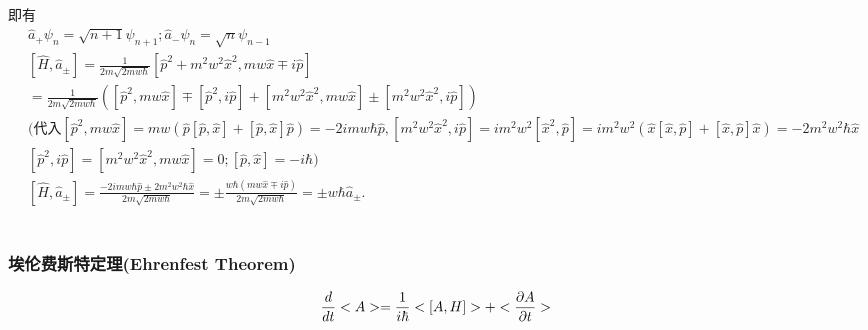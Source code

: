 \documentclass[UTF8,a4paper,10pt]{ctexart}
\begin{document}
即有
\begin{equation}
    \begin{aligned}
        &\hat{a}_{+}\psi_{n}=\sqrt{n+1}\psi_{n+1};\hat{a}_{-}\psi_{n}=\sqrt{n}\psi_{n-1}\\
        &[\hat{H},\hat{a}_{\pm}]=\frac{1}{2m\sqrt{2mw\hbar}}[\hat{p}^2+m^2w^2\hat{x}^2,mw\hat{x}\mp i\hat{p}]\\
        &=\frac{1}{2m\sqrt{2mw\hbar}}([\hat{p}^2,mw\hat{x}]\mp[\hat{p}^2,i\hat{p}]+[m^2w^2\hat{x}^2,mw\hat{x}]\pm[m^2w^2\hat{x}^2,i\hat{p}])\\
        &(\text{代入}[\hat{p}^2,mw\hat{x}]=mw(\hat{p}[\hat{p},\hat{x}]+[\hat{p},\hat{x}]\hat{p})=-2imw\hbar\hat{p},[m^2w^2\hat{x}^2,i\hat{p}]=im^{2}w^{2}[\hat{x}^{2},\hat{p}]=im^2w^2(\hat{x}[\hat{x},\hat{p}]+[\hat{x},\hat{p}]\hat{x})=-2m^2w^2\hbar\hat{x}\\
        &[\hat{p}^2,i\hat{p}]=[m^2w^2\hat{x}^2,mw\hat{x}]=0;[\hat{p},\hat{x}]=-i\hbar)\\
        &[\hat{H},\hat{a}_{\pm}]=\frac{-2imw\hbar\hat{p}\pm 2m^2w^2\hbar\hat{x}}{2m\sqrt{2mw\hbar}}=\pm\frac{w\hbar(mw\hat{x}\mp i\hat{p})}{2m\sqrt{2mw\hbar}}=\pm w\hbar\hat{a}_{\pm}.
    \end{aligned}
\end{equation}

\begin{equation}
    \begin{aligned}
        &
    \end{aligned}
\end{equation}
\subsubsection{埃伦费斯特定理(Ehrenfest Theorem)}

\begin{equation}
    \frac{d}{dt}<A>=\frac{1}{i\hbar}<[A,H]>+<\frac{\partial A}{\partial t}> \\
\end{equation}

\quad \newline
\end{document}
